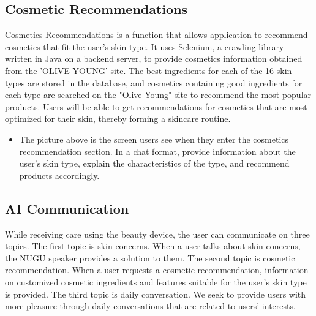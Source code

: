 \documentclass[conference]{IEEEtran}
\begin{document}
\subsection{Cosmetic Recommendations}
Cosmetics Recommendations is a function that allows application to recommend cosmetics that fit the user's skin type. It uses Selenium, a crawling library written in Java on a backend server, to provide cosmetics information obtained from the 'OLIVE YOUNG' site. The best ingredients for each of the 16 skin types are stored in the database, and cosmetics containing good ingredients for each type are searched on the "Olive Young" site to recommend the most popular products. Users will be able to get recommendations for cosmetics that are most optimized for their skin, thereby forming a skincare routine. 
\begin{itemize}
    \begin{figure}[h]
    \centering
    \texttt{[image: fig/HISKIN\_231130-13.jpg]}
    \label{fig:Cosmetic Recommendations Page}
    \caption{Cosmetic Recommendations Page} 
    \end{figure}
    \item[]The picture above is the screen users see when they enter the cosmetics recommendation section. In a chat format, provide information about the user's skin type, explain the characteristics of the type, and recommend products accordingly. \\
\end{itemize}

\subsection{AI Communication}
While receiving care using the beauty device, the user can communicate on three topics. The first topic is skin concerns. When a user talks about skin concerns, the NUGU speaker provides a solution to them. The second topic is cosmetic recommendation. When a user requests a cosmetic recommendation, information on customized cosmetic ingredients and features suitable for the user's skin type is provided. The third topic is daily conversation. We seek to provide users with more pleasure through daily conversations that are related to users’ interests.\\
\end{document}
